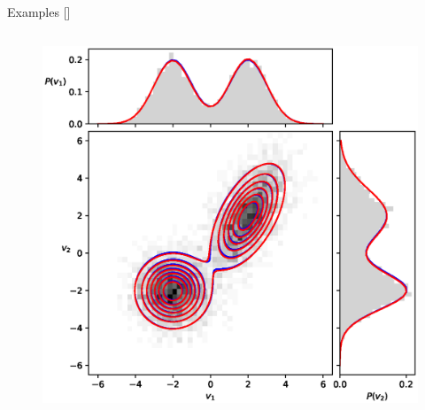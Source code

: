 \documentclass[10pt]{beamer}
\begin{document}
\begin{frame}{Examples \hfill \small [\cite{2020}]}
\begin{figure}[t!]
\begin{center}
        \end{center}
      \end{figure}
      \vspace{-0.5cm}
      \begin{columns}
        \begin{column}[]{0.7 \textwidth}
            \begin{figure}
                \includegraphics[scale=0.30]{figures/TwoGaussians2d.eps}    

\end{figure}
\end{column}
\end{columns}
\end{frame}
\end{document}
